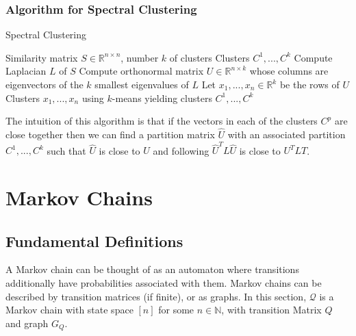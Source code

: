 \documentclass[english]{panikzettel}
\begin{document}
\subsubsection{Algorithm for Spectral Clustering}

\begin{halfboxl}
\vspace{-\baselineskip}
	\begin{algo}{Spectral Clustering}
	{
	\renewcommand{\algorithmicrequire}{\textbf{Input:}}
	\renewcommand{\algorithmicensure}{\textbf{Output:}}
	  \begin{algorithmic}[1]
	  \Require Similarity matrix $S\in\mathbb{R}^{n\times n}$, number $k$ of clusters
	  \Ensure Clusters $C^1,...,C^k$
	  \State Compute Laplacian $L$ of $S$
	  \State Compute orthonormal matrix $U\in\mathbb{R}^{n\times k}$ whose columns are eigenvectors of the $k$ smallest eigenvalues of $L$
	  \State Let $x_1,...,x_n\in\mathbb{R}^k$ be the rows of $U$
	  \State Clusters $x_1,...,x_n$ using $k$-means yielding clusters $C^1,...,C^k$
	  \end{algorithmic}
	}
	\end{algo}
\end{halfboxl}
\begin{halfboxr}
\vspace{-\baselineskip}
	The intuition of this algorithm is that if the vectors in each of the clusters $C^p$ are close together then we can find a partition matrix $\widehat{U}$ with an associated partition $C^1,...,C^k$ such that $\widehat{U}$ is close to $U$ and following $\widehat{U}^TL\widehat{U}$ is close to $U^TLT$.
\end{halfboxr}



\section{Markov Chains}
\subsection{Fundamental Definitions}
A Markov chain can be thought of as an automaton where transitions additionally have probabilities associated with them.
Markov chains can be described by transition matrices (if finite), or as graphs.
In this section, $\mathcal{Q}$ is a Markov chain with state space $[n]$ for some $n \in \mathbb{N}$, with transition Matrix $Q$ and graph $G_Q$.
\end{document}
